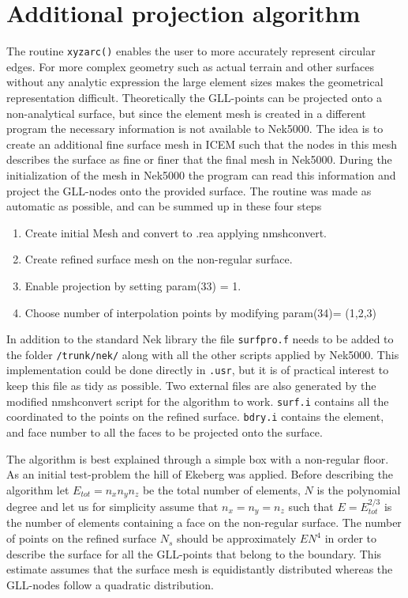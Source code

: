 \section{Additional projection algorithm}\label{surfpro}
The routine \verb|xyzarc()| enables the user to more accurately represent circular edges.
For more complex geometry such as actual terrain and other surfaces without any analytic
expression the large element sizes makes the geometrical representation difficult. 
Theoretically the GLL-points can be projected onto a non-analytical surface, but since 
the element mesh is created in a different program the necessary information is not available
to Nek5000. The idea is to create an additional fine surface mesh in ICEM such
that the nodes in this mesh describes the surface as fine or finer that the final mesh in Nek5000.
During the initialization of the mesh in Nek5000 the program can read this information and project the GLL-nodes onto 
the provided surface. 
The routine was made as automatic as possible, and can be summed up in these four steps
\begin{enumerate}
    \item Create initial Mesh and convert to .rea applying nmshconvert.
        \item Create refined surface mesh on the non-regular surface.
        \item Enable projection by setting param(33) = 1.
        \item Choose number of interpolation points by modifying param(34)= (1,2,3)
\end{enumerate}

In addition to the standard Nek library the file \verb|surfpro.f| needs to be added to 
the folder \verb|/trunk/nek/| along with all the other scripts applied by Nek5000.
This implementation could be done directly in \verb|.usr|, but it is of practical 
interest to keep this file as tidy as possible.
Two external files are also generated by the modified nmshconvert script for the algorithm to work.
\verb|surf.i| contains all the coordinated to the points on the refined surface. 
\verb|bdry.i| contains the element, and face number to all the faces to be projected onto the surface.

The algorithm is best explained through a simple box with a non-regular floor. 
As an initial test-problem the hill of Ekeberg was applied. 
Before describing the algorithm let $E_{tot} = n_xn_yn_z$  be the total number of elements, 
$N$ is the polynomial degree and let us for simplicity assume that $n_x=n_y=n_z$ such that 
$E= E_{tot}^{2/3}$ is the number of elements containing a face on the non-regular surface.
The number of points on the refined surface $N_s$ should be approximately $EN^4$ in 
order to describe the surface for all the GLL-points that belong to the boundary. This estimate
assumes that the surface mesh is equidistantly distributed whereas the GLL-nodes follow a 
quadratic distribution. 

